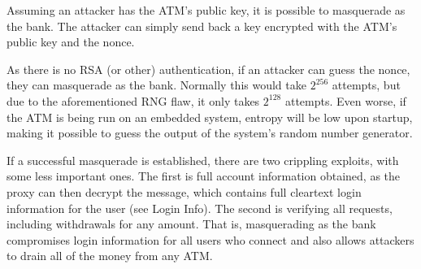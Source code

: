 \documentclass{article}
\begin{document}
Assuming an attacker has the ATM's public key, it is possible to masquerade as the bank. The attacker can simply send back a key encrypted with the ATM's public key and the nonce.

As there is no RSA (or other) authentication, if an attacker can guess the nonce, they can masquerade as the bank. Normally this would take $2^{256}$ attempts, but due to the aforementioned RNG flaw, it only takes $2^{128}$ attempts. Even worse, if the ATM is being run on an embedded system, entropy will be low upon startup, making it possible to guess the output of the system's random number generator.

If a successful masquerade is established, there are two crippling exploits, with some less important ones. The first is full account information obtained, as the proxy can then decrypt the message, which contains full cleartext login information for the user (see Login Info). The second is verifying all requests, including withdrawals for any amount. That is, masquerading as the bank compromises login information for all users who connect and also allows attackers to drain all of the money from any ATM.
\end{document}

